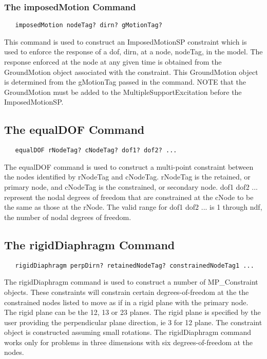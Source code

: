 \documentclass[12pt]{article}
\begin{document}
\subsubsection{The imposedMotion Command}
{\sf\small
\begin{verbatim}
   imposedMotion nodeTag? dirn? gMotionTag? 
\end{verbatim}
}

This command is used to construct an ImposedMotionSP constraint which
is used to enforce the response of a dof, dirn, at a node, nodeTag, in
the model. The response enforced at the node at any given time is
obtained from the GroundMotion object associated with the
constraint. This GroundMotion object is determined from the gMotionTag
passed in the command. NOTE that the GroundMotion must be added to the
MultipleSupportExcitation before the ImposedMotionSP. 


\subsection{The equalDOF Command}
{\sf\small
\begin{verbatim}
   equalDOF rNodeTag? cNodeTag? dof1? dof2? ...
\end{verbatim}
}

The equalDOF command is used to construct a multi-point constraint between
the nodes identified by rNodeTag and cNodeTag. rNodeTag is the retained, or
primary node, and cNodeTag is the constrained, or secondary node. dof1 dof2 ... 
represent the nodal degrees of freedom that are constrained at the cNode to
be the same as those at the rNode. The valid range for dof1 dof2 ... is 1
through ndf, the number of nodal degrees of freedom.

\subsection{The rigidDiaphragm Command}
{\sf\small
\begin{verbatim}
   rigidDiaphragm perpDirn? retainedNodeTag? constrainedNodeTag1 ...
\end{verbatim}
}

The rigidDiaphragm command is used to construct a number of
MP\_Constraint objects. These constraints will constrain certain
degrees-of-freedom at the the constrained nodes listed to move as if in a
rigid plane with the primary node. The rigid plane can be the 12, 13 or
23 planes. The rigid plane is specified by the user providing the
perpendicular plane direction, ie 3 for 12 plane. The constraint
object is constructed assuming small rotations. The rigidDiaphragm
command works only for problems in three dimensions with six
degrees-of-freedom at the nodes. 
\end{document}
